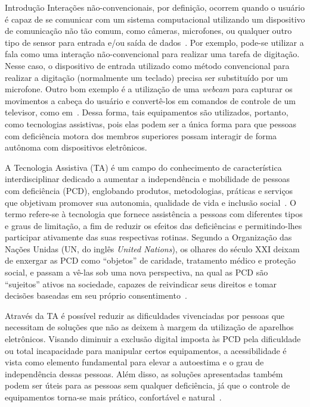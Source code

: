 \begin{chapter}{Introdução}
Interações não-convencionais, por definição, ocorrem quando o usuário é capaz de
se comunicar com um sistema computacional utilizando um dispositivo de
comunicação não tão comum, como câmeras, microfones, ou qualquer outro tipo de
sensor para entrada e/ou saída de dados~\cite{Machado10}. Por exemplo, pode-se
utilizar a fala como uma interação não-convencional para realizar uma tarefa de
digitação. Nesse caso, o dispositivo de entrada utilizado como método
convencional para realizar a digitação (normalmente um teclado) precisa ser
substituído por um microfone. Outro bom exemplo é a utilização de uma
\textit{webcam} para capturar os movimentos a cabeça do usuário e convertê-los
em comandos de controle de um televisor, como em~\cite{Batista17}. Dessa forma,
tais equipamentos são utilizados, portanto, como tecnologias assistivas, pois
elas podem ser a única forma para que pessoas com deficiência motora dos
membros superiores possam interagir de forma autônoma com dispositivos
eletrônicos. %
 
A Tecnologia Assistiva (TA) é um campo do conhecimento de característica
interdisciplinar dedicado a aumentar a independência e mobilidade de pessoas
com deficiência (PCD), englobando produtos, metodologias, práticas e serviços
que objetivam promover sua autonomia, qualidade de vida e inclusão
social~\cite{cat09}. O termo refere-se à tecnologia que fornece
assistência a pessoas com diferentes tipos e graus de limitação, a fim de
reduzir os efeitos das deficiências e permitindo-lhes participar ativamente das
suas respectivas rotinas. Segundo a Organização das Nações Unidas (UN, do inglês
\textit{United Nations}), os olhares do século XXI deixam de enxergar as PCD
como ``objetos'' de caridade, tratamento médico e proteção social, e passam a
vê-las sob uma nova perspectiva, na qual as PCD são ``sujeitos'' ativos na
sociedade, capazes de reivindicar seus direitos e tomar decisões baseadas em seu
próprio consentimento~\cite{UN07}. %

Através da TA é possível reduzir as dificuldades vivenciadas por pessoas que
necessitam de soluções que não as deixem à margem da utilização de aparelhos
eletrônicos. Visando diminuir a exclusão digital imposta às PCD pela
dificuldade ou total incapacidade para manipular certos equipamentos, a
acessibilidade é vista como elemento fundamental para elevar a autoestima e o
grau de independência dessas pessoas. Além disso, as soluções apresentadas
também podem ser úteis para as pessoas sem qualquer deficiência, já que o
controle de equipamentos torna-se mais prático, confortável e
natural~\cite{Wechsung09}. %


\end{chapter}
